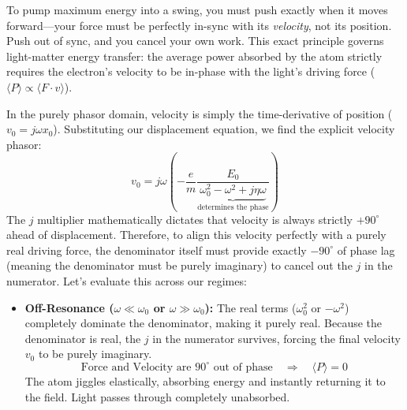 \begin{keyinsight}
    To pump maximum energy into a swing, you must push exactly when it moves forward—your force must be perfectly in-sync with its \emph{velocity}, not its position. Push out of sync, and you cancel your own work. This exact principle governs light-matter energy transfer: the average power absorbed by the atom strictly requires the electron's velocity to be in-phase with the light's driving force ($\langle P \rangle \propto \langle F \cdot v \rangle$).

    In the purely phasor domain, velocity is simply the time-derivative of position ($v_0 = j\omega x_0$). Substituting our displacement equation, we find the explicit velocity phasor:
    \begin{equation*}
        v_0 = j\omega \left( -\frac{e}{m}\frac{E_0}{\underbrace{\omega_0^2 - \omega^2 + j\eta\omega}_{\text{determines the phase}}} \right)
    \end{equation*}
    The $j$ multiplier mathematically dictates that velocity is always strictly $+90^\circ$ ahead of displacement. Therefore, to align this velocity perfectly with a purely real driving force, the denominator itself must provide exactly $-90^\circ$ of phase lag (meaning the denominator must be purely imaginary) to cancel out the $j$ in the numerator. Let's evaluate this across our regimes:

    \begin{itemize}
        \item \textbf{Off-Resonance ($\omega \ll \omega_0$ or $\omega \gg \omega_0$):} The real terms ($\omega_0^2$ or $-\omega^2$) completely dominate the denominator, making it purely real. Because the denominator is real, the $j$ in the numerator survives, forcing the final velocity $v_0$ to be purely imaginary.
              \begin{equation*}
                  \text{Force and Velocity are } 90^\circ \text{ out of phase} \quad \Rightarrow \quad \langle P \rangle = 0
              \end{equation*}
              The atom jiggles elastically, absorbing energy and instantly returning it to the field. Light passes through completely unabsorbed.


\end{itemize}
\end{keyinsight}
